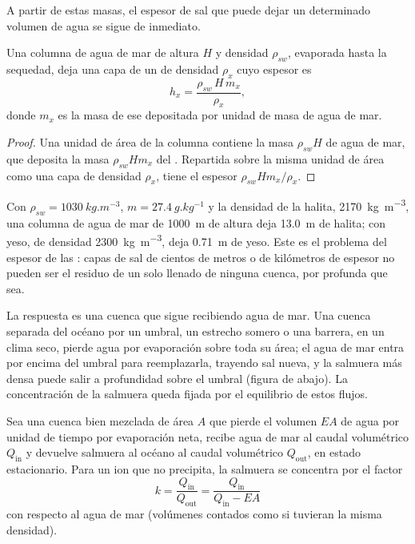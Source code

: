A partir de estas masas, el espesor de sal que puede dejar un determinado volumen de agua se sigue de inmediato.

\begin{proposition}\label{prop:b1:chemical-biogenic-sediments:column}
Una columna de agua de mar de altura $H$ y densidad $\rho_{sw}$, evaporada hasta la sequedad, deja una capa de un  de densidad $\rho_x$ cuyo espesor es
\[
h_x = \frac{\rho_{sw}\,H\,m_x}{\rho_x},
\]
donde $m_x$ es la masa de ese  depositada por unidad de masa de agua de mar.
\end{proposition}

\begin{proof}
Una unidad de área de la columna contiene la masa $\rho_{sw}H$ de agua de mar, que deposita la masa $\rho_{sw}Hm_x$ del . Repartida sobre la misma unidad de área
como una capa de densidad $\rho_x$, tiene el espesor $\rho_{sw}Hm_x/\rho_x$.
\end{proof}

Con $\rho_{sw} = \qty{1030}{kg.m^{-3}}$, $m = \qty{27.4}{g.kg^{-1}}$ y la densidad de la halita, \qty{2170}{kg.m^{-3}}, una columna de agua de mar de \qty{1000}{m} de altura
deja \qty{13.0}{m} de halita; con yeso, de densidad \qty{2300}{kg.m^{-3}}, deja \qty{0.71}{m} de yeso. Este es el problema del espesor de las : capas de sal de cientos de
metros o de kilómetros de espesor no pueden ser el residuo de un solo llenado de ninguna cuenca, por profunda que sea.

La respuesta es una cuenca que sigue recibiendo agua de mar. Una cuenca separada del océano por un umbral, un estrecho somero o una barrera, en un clima seco, pierde agua por evaporación
sobre toda su área; el agua de mar entra por encima del umbral para reemplazarla, trayendo sal nueva, y la salmuera más densa puede salir a profundidad sobre el umbral (figura de abajo).
La concentración de la salmuera queda fijada por el equilibrio de estos flujos.

\begin{proposition}\label{prop:b1:chemical-biogenic-sediments:barred}
Sea una cuenca bien mezclada de área $A$ que pierde el volumen $EA$ de agua por unidad de tiempo por evaporación neta, recibe agua de mar al caudal volumétrico $Q_{\mathrm{in}}$ y devuelve
salmuera al océano al caudal volumétrico $Q_{\mathrm{out}}$, en estado estacionario. Para un ion que no precipita, la salmuera se concentra por el factor
\[
k = \frac{Q_{\mathrm{in}}}{Q_{\mathrm{out}}} = \frac{Q_{\mathrm{in}}}{Q_{\mathrm{in}} - EA}
\]
con respecto al agua de mar (volúmenes contados como si tuvieran la misma densidad).
\end{proposition}

